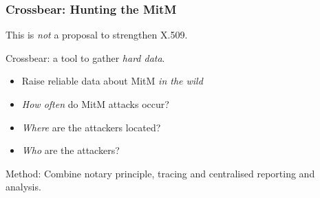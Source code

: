 

\begin{frame}
\frametitle{Crossbear: Hunting the MitM}
\begin{block}{This is \textit{not} a proposal to strengthen X.509.}\end{block}
\begin{block}{Crossbear: a tool to gather \textit{hard data}.}
  \begin{itemize}
    \item Raise reliable data about MitM \textit{in the wild}
    \item \textit{How often} do MitM attacks occur?
    \item \textit{Where} are the attackers located?
    \item \textit{Who} are the attackers?
  \end{itemize}
\end{block}
\begin{block}{Method: Combine notary principle, tracing and centralised reporting and analysis.}\end{block}
\end{frame}

